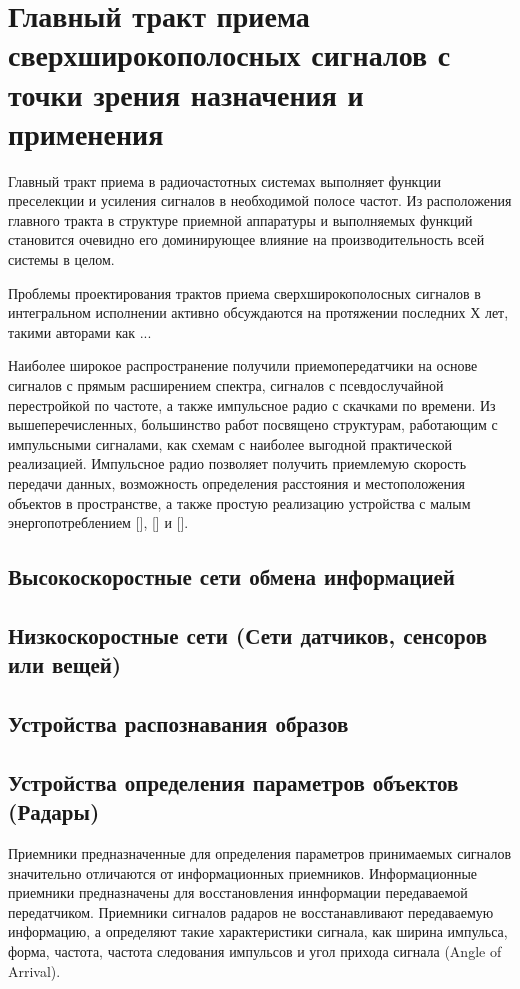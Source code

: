 \section{Главный тракт приема сверхширокополосных сигналов с точки зрения назначения и применения}
Главный тракт приема в радиочастотных системах выполняет функции преселекции и усиления сигналов в необходимой полосе частот. Из расположения главного тракта в структуре приемной аппаратуры и выполняемых функций становится очевидно его доминирующее влияние на производительность всей системы в целом.

Проблемы проектирования трактов приема сверхширокополосных сигналов в интегральном исполнении активно обсуждаются на протяжении последних Х лет, такими авторами как ...

Наиболее широкое распространение получили приемопередатчики на основе сигналов с прямым расширением спектра, сигналов с псевдослучайной перестройкой по частоте, а также импульсное радио с скачками по времени. Из вышеперечисленных, большинство работ посвящено структурам, работающим с импульсными сигналами, как схемам с наиболее выгодной практической реализацией. Импульсное радио позволяет получить приемлемую скорость передачи данных, возможность определения расстояния и  местоположения объектов в пространстве, а также простую реализацию устройства с малым энергопотреблением [], [] и [].

\subsection{Высокоскоростные сети обмена информацией}

\subsection{Низкоскоростные сети (Сети датчиков, сенсоров или вещей)}

\subsection{Устройства распознавания образов}

\subsection{Устройства определения параметров объектов (Радары)}
Приемники предназначенные для определения параметров принимаемых сигналов значительно отличаются от информационных приемников. Информационные приемники предназначены для восстановления иннформации передаваемой передатчиком. Приемники сигналов радаров не восстанавливают передаваемую информацию, а определяют такие характеристики сигнала, как ширина импульса, форма, частота, частота следования импульсов и угол прихода сигнала (Angle of Arrival).

